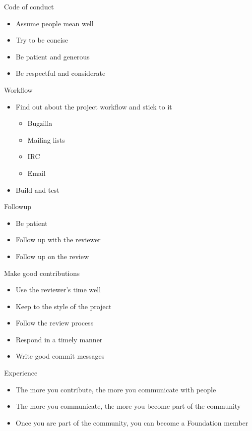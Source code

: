 \documentclass{beamer}
\begin{document}
\begin{frame}{Code of conduct}
  \begin{itemize}
  \item
    Assume people mean well
  \item
    Try to be concise
  \item
    Be patient and generous
  \item
    Be respectful and considerate
  \end{itemize}
\end{frame}

\begin{frame}{Workflow}
  \begin{itemize}
  \item
    Find out about the project workflow and stick to it
    \begin{itemize}
    \item
      Bugzilla
    \item
      Mailing lists
    \item
      IRC
    \item
      Email
    \end{itemize}
  \item
    Build and test
  \end{itemize}
\end{frame}

\begin{frame}{Followup}
  \begin{itemize}
  \item
    Be patient
  \item
    Follow up with the reviewer
  \item
    Follow up on the review
  \end{itemize}
\end{frame}

\begin{frame}{Make good contributions}
  \begin{itemize}
  \item
    Use the reviewer's time well
  \item
    Keep to the style of the project
  \item
    Follow the review process
  \item
    Respond in a timely manner
  \item
    Write good commit messages
  \end{itemize}
\end{frame}

\begin{frame}{Experience}
  \begin{itemize}
  \item
    The more you contribute, the more you communicate with people
  \item
    The more you communicate, the more you become part of the community
  \item
    Once you are part of the community, you can become a Foundation member
  \end{itemize} 
\end{frame}
\end{document}

